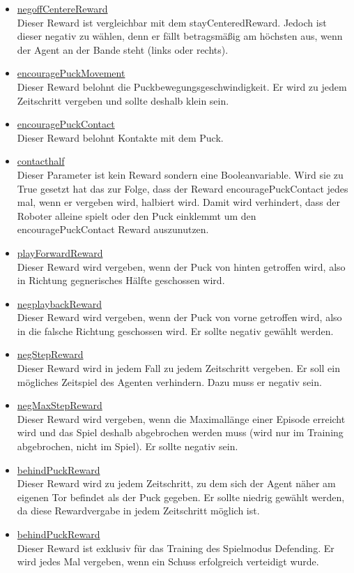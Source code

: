 \begin{itemize}
\item \underline{negoffCentereReward} \\
Dieser Reward ist vergleichbar mit dem stayCenteredReward. Jedoch ist dieser negativ zu wählen, denn er fällt betragsmäßig am höchsten aus, wenn der Agent an der Bande steht (links oder rechts).

\item \underline{encouragePuckMovement} \\
Dieser Reward belohnt die Puckbewegungsgeschwindigkeit. Er wird zu jedem Zeitschritt vergeben und sollte deshalb klein sein. 

\item \underline{encouragePuckContact} \\
Dieser Reward belohnt Kontakte mit dem Puck. 

\item \underline{contacthalf} \\
Dieser Parameter ist kein Reward sondern eine Booleanvariable. Wird sie zu True gesetzt hat das zur Folge, dass der Reward encouragePuckContact jedes mal, wenn er vergeben wird, halbiert wird. Damit wird verhindert, dass der Roboter alleine spielt oder den Puck einklemmt um den encouragePuckContact Reward auszunutzen.

\item \underline{playForwardReward} \\
Dieser Reward wird vergeben, wenn der Puck von hinten getroffen wird, also in Richtung gegnerisches Hälfte geschossen wird.

\item \underline{negplaybackReward} \\
Dieser Reward wird vergeben, wenn der Puck von vorne getroffen wird, also in die falsche Richtung geschossen wird. Er sollte negativ gewählt werden.

\item \underline{negStepReward} \\
Dieser Reward wird in jedem Fall zu jedem Zeitschritt vergeben. Er soll ein mögliches Zeitspiel des Agenten verhindern. Dazu muss er negativ sein. 

\item \underline{negMaxStepReward} \\
Dieser Reward wird vergeben, wenn die Maximallänge einer Episode erreicht wird und das Spiel deshalb abgebrochen werden muss (wird nur im Training abgebrochen, nicht im Spiel). Er sollte negativ sein.

\item \underline{behindPuckReward} \\
Dieser Reward wird zu jedem Zeitschritt, zu dem sich der Agent näher am eigenen Tor befindet als der Puck gegeben. Er sollte niedrig gewählt werden, da diese Rewardvergabe in jedem Zeitschritt möglich ist.

\item \underline{behindPuckReward} \\
Dieser Reward ist exklusiv für das Training des Spielmodus Defending. Er wird jedes Mal vergeben, wenn ein Schuss erfolgreich verteidigt wurde.

\end{itemize}

